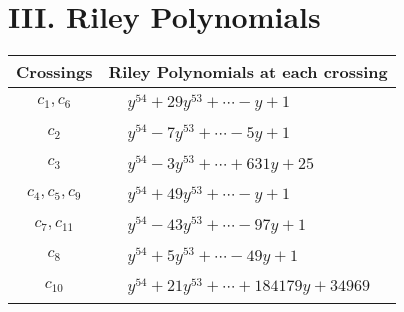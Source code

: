 \documentclass[1p]{elsarticle_modified}
\theoremstyle{definition}
\begin{document}
\centering \section*{ III. Riley Polynomials}
\begin{tabular}{m{50pt}|m{274pt}}
Crossings & \hspace{64pt}Riley Polynomials at each crossing \\
\hline $$\begin{aligned}c_{1},c_{6}\end{aligned}$$&$\begin{aligned}
&y^{54}+29 y^{53}+\cdots- y+1
\end{aligned}$\\
\hline $$\begin{aligned}c_{2}\end{aligned}$$&$\begin{aligned}
&y^{54}-7 y^{53}+\cdots-5 y+1
\end{aligned}$\\
\hline $$\begin{aligned}c_{3}\end{aligned}$$&$\begin{aligned}
&y^{54}-3 y^{53}+\cdots+631 y+25
\end{aligned}$\\
\hline $$\begin{aligned}c_{4},c_{5},c_{9}\end{aligned}$$&$\begin{aligned}
&y^{54}+49 y^{53}+\cdots- y+1
\end{aligned}$\\
\hline $$\begin{aligned}c_{7},c_{11}\end{aligned}$$&$\begin{aligned}
&y^{54}-43 y^{53}+\cdots-97 y+1
\end{aligned}$\\
\hline $$\begin{aligned}c_{8}\end{aligned}$$&$\begin{aligned}
&y^{54}+5 y^{53}+\cdots-49 y+1
\end{aligned}$\\
\hline $$\begin{aligned}c_{10}\end{aligned}$$&$\begin{aligned}
&y^{54}+21 y^{53}+\cdots+184179 y+34969
\end{aligned}$\\
\hline
\end{tabular}
\vskip 2pc
\end{document}

